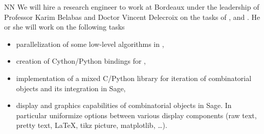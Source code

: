 \begin{participant}[type=R, PM=48]{NN}
We will hire a research engineer to work at Bordeaux
 under the leadership of Professor Karim Belabas and Doctor Vincent
Delecroix on the tasks of ,  and .
He or she will work on the following tasks
\begin{itemize}
\item parallelization of some low-level algorithms in \PariGP,
\item creation of Cython/Python bindings for \PariGP,
\item implementation of a mixed C/Python library for iteration of combinatorial
objects and its integration in Sage,
\item display and graphics capabilities of combinatorial objects in Sage. In particular
uniformize options between various display components (raw text, pretty text, \LaTeX, tikz picture,
matplotlib, \ldots).
\end{itemize}
\end{participant}
